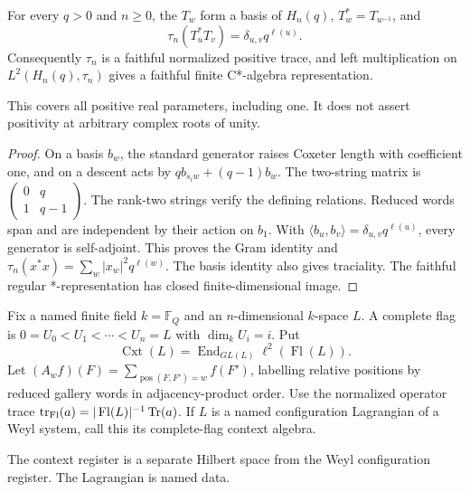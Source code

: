 \begin{theorem}
{\normalfont\statusProved}\quad For every $q>0$ and $n\geq0$, the
$T_w$ form a basis of $H_n(q)$, $T_w^*=T_{w^{-1}}$, and
\[
\tau_n(T_u^*T_v)=\delta_{u,v}q^{\ell(u)}.
\]
Consequently $\tau_n$ is a faithful normalized positive trace, and left
multiplication on $L^2(H_n(q),\tau_n)$ gives a faithful finite C*-algebra
representation.
\end{theorem}
\begin{scope}This covers all positive real parameters, including one.
It does not assert positivity at arbitrary complex roots of unity.\end{scope}
\begin{proof}
On a basis $b_w$, the standard generator raises Coxeter length with
coefficient one, and on a descent acts by
$q b_{s_iw}+(q-1)b_w$. The two-string matrix is
$\left(\begin{smallmatrix}0&q\\1&q-1\end{smallmatrix}\right)$.
The rank-two strings verify the defining relations. Reduced words span
and are independent by their action on $b_1$. With
$\langle b_u,b_v\rangle=\delta_{u,v}q^{\ell(u)}$, every generator is
self-adjoint. This proves the Gram identity and
$\tau_n(x^*x)=\sum_w|x_w|^2q^{\ell(w)}$. The basis identity also gives
traciality. The faithful regular *-representation has closed finite-dimensional image.
\end{proof}

\begin{definition}
Fix a named finite field $k=\mathbb F_Q$ and an $n$-dimensional $k$-space
$L$. A complete flag is $0=U_0<U_1<\cdots<U_n=L$ with
$\dim_kU_i=i$. Put
\[
\operatorname{Cxt}(L)=\operatorname{End}_{GL(L)}\ell^2(\operatorname{Fl}(L)).
\]
Let $(A_wf)(F)=\sum_{\operatorname{pos}(F,F')=w}f(F')$, labelling
relative positions by reduced gallery words in adjacency-product order.
Use the normalized operator trace
$\operatorname{tr}_{\rm Fl}(a)=|\operatorname{Fl}(L)|^{-1}\operatorname{Tr}(a)$.
If $L$ is a named configuration Lagrangian of a Weyl system, call this
its complete-flag context algebra.
\end{definition}
\begin{scope}The context register is a separate Hilbert space from the
Weyl configuration register. The Lagrangian is named data.\end{scope}

